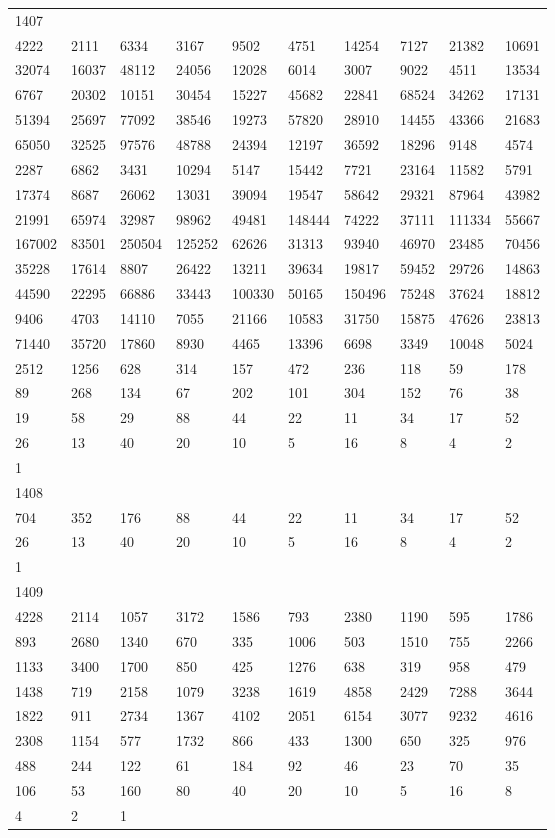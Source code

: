 \begin{longtable}{*{10}{l}}
1407&&&&&&&&&\\
4222& 2111& 6334& 3167& 9502& 4751& 14254& 7127& 21382& 10691\\
32074& 16037& 48112& 24056& 12028& 6014& 3007& 9022& 4511& 13534\\
6767& 20302& 10151& 30454& 15227& 45682& 22841& 68524& 34262& 17131\\
51394& 25697& 77092& 38546& 19273& 57820& 28910& 14455& 43366& 21683\\
65050& 32525& 97576& 48788& 24394& 12197& 36592& 18296& 9148& 4574\\
2287& 6862& 3431& 10294& 5147& 15442& 7721& 23164& 11582& 5791\\
17374& 8687& 26062& 13031& 39094& 19547& 58642& 29321& 87964& 43982\\
21991& 65974& 32987& 98962& 49481& 148444& 74222& 37111& 111334& 55667\\
167002& 83501& 250504& 125252& 62626& 31313& 93940& 46970& 23485& 70456\\
35228& 17614& 8807& 26422& 13211& 39634& 19817& 59452& 29726& 14863\\
44590& 22295& 66886& 33443& 100330& 50165& 150496& 75248& 37624& 18812\\
9406& 4703& 14110& 7055& 21166& 10583& 31750& 15875& 47626& 23813\\
71440& 35720& 17860& 8930& 4465& 13396& 6698& 3349& 10048& 5024\\
2512& 1256& 628& 314& 157& 472& 236& 118& 59& 178\\
89& 268& 134& 67& 202& 101& 304& 152& 76& 38\\
19& 58& 29& 88& 44& 22& 11& 34& 17& 52\\
26& 13& 40& 20& 10& 5& 16& 8& 4& 2\\
1& \\

1408&&&&&&&&&\\
704& 352& 176& 88& 44& 22& 11& 34& 17& 52\\
26& 13& 40& 20& 10& 5& 16& 8& 4& 2\\
1& \\

1409&&&&&&&&&\\
4228& 2114& 1057& 3172& 1586& 793& 2380& 1190& 595& 1786\\
893& 2680& 1340& 670& 335& 1006& 503& 1510& 755& 2266\\
1133& 3400& 1700& 850& 425& 1276& 638& 319& 958& 479\\
1438& 719& 2158& 1079& 3238& 1619& 4858& 2429& 7288& 3644\\
1822& 911& 2734& 1367& 4102& 2051& 6154& 3077& 9232& 4616\\
2308& 1154& 577& 1732& 866& 433& 1300& 650& 325& 976\\
488& 244& 122& 61& 184& 92& 46& 23& 70& 35\\
106& 53& 160& 80& 40& 20& 10& 5& 16& 8\\
4& 2& 1& \\


\end{longtable}
